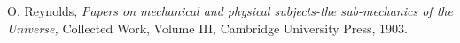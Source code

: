 \documentclass[12pt]{article}
\begin{document}
\begin{thebibliography}{1}
O. Reynolds, {\em Papers on mechanical and physical subjects-the sub-mechanics of the Universe,} Collected Work, Volume III, Cambridge University Press, 1903.
\end{thebibliography} 


\end{document}
